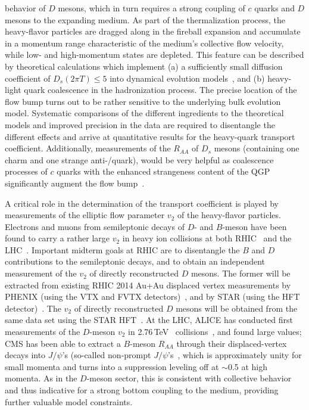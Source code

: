  behavior of $D$ mesons, which in turn requires a strong coupling of $c$ quarks and $D$ mesons 
 to the expanding medium. As part of the thermalization process, the heavy-flavor
 particles are dragged along in the fireball expansion and accumulate in a momentum range
 characteristic of the medium's collective flow velocity, while low- and high-momentum states are 
 depleted. This feature can be described by theoretical calculations which implement 
 (a) a sufficiently small diffusion coefficient of $ D_s (2\pi T) \leq5$ into dynamical 
 evolution models~\cite{He:2011qa,Gossiaux:2008jv,Cao:2013ita}, and 
 (b) heavy-light 
 quark coalescence in the hadronization process. The precise location of the
 flow bump turns out to be rather sensitive to the underlying bulk evolution model. 
 Systematic comparisons of the different ingredients to the theoretical models and 
 improved precision in the data are required to disentangle the different effects and 
 arrive at quantitative results for the heavy-quark transport coefficient. 
 Additionally, measurements of the $R_{AA}$ of $D_s$ mesons (containing one charm and 
 one strange anti-/quark), would be very helpful as coalescence processes of $c$ quarks 
 with the enhanced strangeness content of the QGP significantly augment the flow 
 bump~\cite{He:2012df}.  

 A critical role in the determination of the transport coefficient is played by measurements of the elliptic flow parameter
 $v_2$ of the heavy-flavor particles. Electrons and muons from semileptonic decays 
 of $D$- and $B$-meson have been found to carry a rather large $v_2$ in heavy ion
 collisions at both RHIC~\cite{Adare:2006nq,Mustafa:2012jh} and the LHC~\cite{Sakai:2013ata}. 
 Important midterm goals at RHIC are to disentangle the $B$ and $D$ contributions to the semileptonic decays, and to 
 obtain an independent measurement of the $v_2$ of directly reconstructed $D$ mesons. 
 The former will be extracted from existing RHIC 2014 Au+Au displaced vertex 
 measurements by PHENIX (using the VTX and FVTX detectors)~\cite{Nouicer:2012pr}, and by 
 STAR (using the HFT detector)~\cite{Kapitan:2008kk,Qiu:2014dha}. The $v_2$ of directly reconstructed $D$ mesons 
 will be obtained from the same data set using the STAR HFT~\cite{Qiu:2014dha}. 
 At the LHC, ALICE has 
 conducted first measurements of the $D$-meson $v_2$ in 2.76\,TeV \PbPb\ 
 collisions~\cite{Abelev:2013lca}, and found large values; CMS has been able to extract 
 a $B$-meson $R_{AA}$ through their displaced-vertex decays into $J/\psi$'s (so-called 
 non-prompt $J/\psi$'s~\cite{Chatrchyan:2012np}, which is approximately unity for small  
 momenta and turns into a suppression leveling off at $\sim$0.5 at high momenta. As 
 in the $D$-meson sector, this is consistent with collective behavior and thus indicative 
 for a strong bottom coupling to the medium, providing further valuable model constraints.

